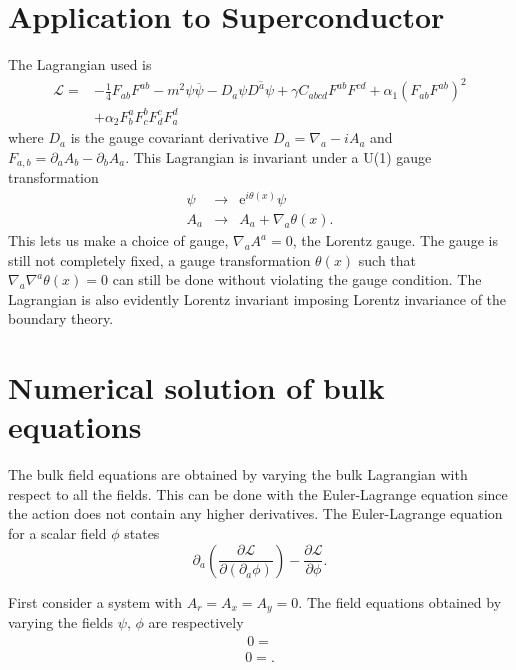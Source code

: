 \documentclass[12pt]{article}
\begin{document}
\section{Application to Superconductor}
The Lagrangian used is
\begin{eqnarray}
 \mathcal{L}=&-\frac{1}{4}F_{ab}F^{ab}-m^2\psi\overline{\psi}-D_a\psi\overline{D^a\psi}
+\gamma C_{abcd}F^{ab}F^{cd}+\alpha_1(F_{ab}F^{ab})^2\nonumber\\
&+\alpha_2F^a_bF^b_cF^c_dF^d_a
\end{eqnarray}
where $D_a$ is the gauge covariant derivative $D_a=\nabla_a-iA_a$ and $F_{a,b}=\partial_aA_b-\partial_bA_a$. This Lagrangian is invariant under a U(1) gauge transformation
\begin{eqnarray}
 \psi&\rightarrow&\mathrm{e}^{i\theta(x)}\psi\\
 A_a&\rightarrow& A_a+\nabla_a\theta(x).
\end{eqnarray}
This lets us make a choice of gauge, $\nabla_aA^a=0$, the Lorentz gauge. The gauge is still not completely fixed, a gauge transformation $\theta(x)$ such that $\nabla_a\nabla^a\theta(x)=0$ can still be done without violating the gauge condition.
The Lagrangian is also evidently Lorentz invariant imposing Lorentz invariance of the boundary theory.
\section{Numerical solution of bulk equations}
The bulk field equations are obtained by varying the bulk Lagrangian with respect to all the fields. This can be done with the Euler-Lagrange equation since the action does not contain any higher derivatives. The Euler-Lagrange equation for a scalar field $\phi$ states
\begin{equation}
 \partial_a\left(\frac{\partial\mathcal{L}}{\partial(\partial_a\phi)}\right)-\frac{\partial\mathcal{L}}{\partial\phi}.
\end{equation}


First consider a system with $A_r=A_x=A_y=0$. The field equations obtained by varying the fields $\psi$, $\phi$ are respectively
\begin{eqnarray}
0=
\end{eqnarray}
\begin{eqnarray}
0=.
\end{eqnarray}

\section{}
\end{document}
